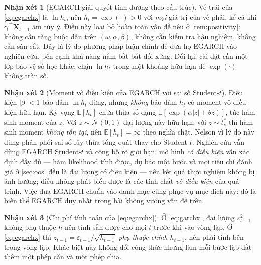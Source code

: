 \documentclass[12pt,a4paper]{article}
\numberwithin{equation}{section}
\theoremstyle{definition}
\newtheorem{remark}{Nhận xét}[section]
\newcommand{\E}{\mathbb{E}}
\newcommand{\Xvec}{\symbf{X}}
\newcommand{\bmgamma}{\symbf{\gamma}}
\begin{document}
	\begin{remark}[EGARCH giải quyết tính dương theo cấu trúc]\label{rem:egarch-positivity}
		Vế trái của \eqref{eq:egarchx} là $\ln h_t$, nên $h_t=\exp(\cdot)>0$ với \emph{mọi}
		giá trị của vế phải, kể cả khi $\bmgamma^{\top}\Xvec_{t-1}$ âm tùy ý. Điều này loại
		bỏ hoàn toàn vấn đề nêu ở \cref{rem:positivity}: không cần ràng buộc dấu trên
		$(\omega,\alpha,\beta)$, không cần kiểm tra hậu nghiệm, không cần sàn cắt. Đây là lý
		do phương pháp luận chính để đưa họ EGARCH vào nghiên cứu, bên cạnh khả năng nắm bắt
		bất đối xứng. Đổi lại, cài đặt cần một lớp bảo vệ số học khác: chặn $\ln h_t$ trong
		một khoảng hữu hạn để $\exp(\cdot)$ không tràn số.
	\end{remark}

	\begin{remark}[Moment vô điều kiện của EGARCH với sai số Student-$t$]\label{rem:egarch-moment}
		Điều kiện $\lvert\beta\rvert<1$ bảo đảm $\ln h_t$ dừng, nhưng \emph{không} bảo đảm
		$h_t$ có moment vô điều kiện hữu hạn. Kỳ vọng $\E[h_t]$ chứa thừa số dạng
		$\E\!\left[\exp\left(\alpha\lvert z\rvert+\theta z\right)\right]$, tức hàm sinh moment
		của $z$. Với $z\sim\mathcal N(0,1)$ đại lượng này hữu hạn; với $z\sim t^{*}_{\nu}$ thì
		hàm sinh moment \emph{không tồn tại}, nên $\E[h_t]=\infty$ theo nghĩa chặt. Nelson
		\cite{nelson1991} vì lý do này dùng phân phối sai số lũy thừa tổng quát thay cho
		Student-$t$. Nghiên cứu vẫn dùng EGARCH Student-$t$ và công bố rõ giới hạn: mô hình
		\emph{có điều kiện} vẫn xác định đầy đủ --- hàm likelihood tính được, dự báo một bước
		và mọi tiêu chí đánh giá ở \cref{sec:oos} đều là đại lượng có điều kiện --- nên kết
		quả thực nghiệm không bị ảnh hưởng; điều không phát biểu được là các tính chất
		\emph{vô điều kiện} của quá trình. Việc đưa EGARCH chuẩn vào danh mục cũng phục vụ mục
		đích này: đó là biến thể EGARCH duy nhất trong bài không vướng vấn đề trên.
	\end{remark}

	\begin{remark}[Chi phí tính toán của \eqref{eq:egarchx}]\label{rem:egarch-cost}
		Ở \eqref{eq:garchx}, đại lượng $\varepsilon_{t-1}^{2}$ không phụ thuộc $h$ nên tính
		sẵn được cho mọi $t$ trước khi vào vòng lặp. Ở \eqref{eq:egarchx} thì
		$z_{t-1}=\varepsilon_{t-1}/\sqrt{h_{t-1}}$ \emph{phụ thuộc chính $h_{t-1}$}, nên phải
		tính bên trong vòng lặp. Khác biệt này không đổi công thức nhưng làm mỗi bước lặp đắt
		thêm một phép căn và một phép chia.
	\end{remark}
\end{document}
